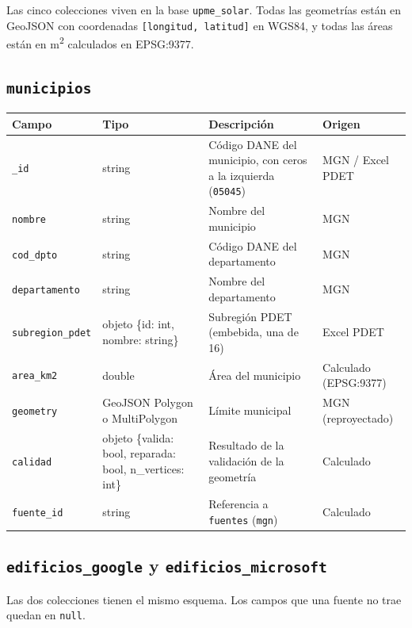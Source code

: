 \documentclass[11pt,a4paper]{article}
\newcommand{\campo}[1]{\texttt{#1}}
\begin{document}
Las cinco colecciones viven en la base \campo{upme\_solar}. Todas las
geometrías están en GeoJSON con coordenadas \campo{[longitud, latitud]} en
WGS84, y todas las áreas están en m\textsuperscript{2} calculados en
EPSG:9377.

\subsection{\texorpdfstring{\campo{municipios}}{municipios}}

\begin{table}[H]
\centering\small
\begin{tabularx}{\textwidth}{@{}p{3cm}p{3.6cm}Lp{2.6cm}@{}}
\toprule
\textbf{Campo} & \textbf{Tipo} & \textbf{Descripción} & \textbf{Origen} \\
\midrule
\campo{\_id} & string  & Código DANE del municipio, con ceros a la izquierda (\campo{05045}) & MGN / Excel PDET \\
\campo{nombre} & string & Nombre del municipio & MGN \\
\campo{cod\_dpto} & string  & Código DANE del departamento & MGN \\
\campo{departamento} & string & Nombre del departamento & MGN \\
\campo{subregion\_pdet} & objeto \{id: int, nombre: string\} & Subregión PDET (embebida, una de 16) & Excel PDET \\
\campo{area\_km2} & double & Área del municipio & Calculado (EPSG:9377) \\
\campo{geometry} & GeoJSON Polygon o MultiPolygon & Límite municipal & MGN (reproyectado) \\
\campo{calidad} & objeto \{valida: bool, reparada: bool, n\_vertices: int\} & Resultado de la validación de la geometría & Calculado \\
\campo{fuente\_id} & string & Referencia a \campo{fuentes} (\campo{mgn}) & Calculado \\
\bottomrule
\end{tabularx}
\end{table}

\subsection{\texorpdfstring{\campo{edificios\_google} y \campo{edificios\_microsoft}}{edificios\_google y edificios\_microsoft}}
 
Las dos colecciones tienen el mismo esquema. Los campos que una fuente no
trae quedan en \campo{null}.
 
\end{document}
